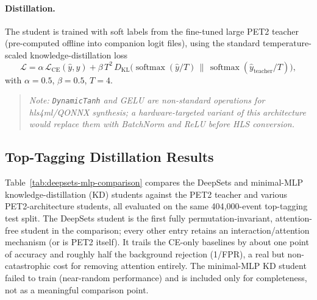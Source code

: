 \paragraph{Distillation.}
The student is trained with soft labels from the fine-tuned large PET2 teacher
(pre-computed offline into companion logit files), using the standard
temperature-scaled knowledge-distillation loss
\begin{equation}
    \mathcal{L} = \alpha \, \mathcal{L}_{\mathrm{CE}}(\hat{y}, y)
    + \beta \, T^2 \, D_{\mathrm{KL}}\!\Big(
        \operatorname{softmax}(\hat{y}/T) \,\big\|\, \operatorname{softmax}(\hat{y}_{\mathrm{teacher}}/T)
      \Big),
\end{equation}
with $\alpha = 0.5$, $\beta = 0.5$, $T = 4$.

\begin{quote}
\emph{Note: \texttt{DynamicTanh} and GELU are non-standard operations for
hls4ml/QONNX synthesis; a hardware-targeted variant of this architecture would
replace them with BatchNorm and ReLU before HLS conversion.}
\end{quote}

\subsection{Top-Tagging Distillation Results}
\label{sec:deepsets-mlp-comparison}

Table~\ref{tab:deepsets-mlp-comparison} compares the DeepSets and minimal-MLP
knowledge-distillation (KD) students against the PET2 teacher and various
PET2-architecture students, all evaluated on the same 404{,}000-event
top-tagging test split. The DeepSets student is the first fully
permutation-invariant, attention-free student in the comparison; every other
entry retains an interaction/attention mechanism (or is PET2 itself). It
trails the CE-only baselines by about one point of accuracy and roughly half
the background rejection (1/FPR), a real but non-catastrophic cost for
removing attention entirely. The minimal-MLP KD student failed to train
(near-random performance) and is included only for completeness, not as a
meaningful comparison point.

